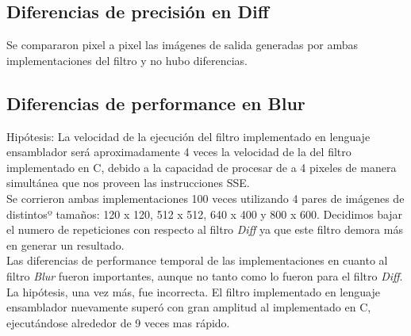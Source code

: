 \documentclass[10pt,a4paper,spanish]{article}
\begin{document}
\subsection{Diferencias de precisión en Diff}

Se compararon pixel a pixel las imágenes de salida generadas por ambas implementaciones del filtro y no hubo diferencias.

\subsection{Diferencias de performance en Blur}

Hipótesis: La velocidad de la ejecución del filtro implementado en lenguaje ensamblador será aproximadamente 4 veces la velocidad de la del filtro implementado en C, debido a la capacidad de procesar de a 4 pixeles de manera simultánea que nos proveen las instrucciones SSE. \\

Se corrieron ambas implementaciones 100 veces utilizando 4 pares de imágenes de distintosº tamaños: 120 x 120, 512 x 512, 640 x 400 y 800 x 600. Decidimos bajar el numero de repeticiones con respecto al filtro \textit{Diff} ya que este filtro demora más en generar un resultado.\\

Las diferencias de performance temporal de las implementaciones en cuanto al filtro \textit{Blur} fueron importantes, aunque no tanto como lo fueron para el filtro \textit{Diff}. La hipótesis, una vez más, fue incorrecta. El filtro implementado en lenguaje ensamblador nuevamente superó con gran amplitud al implementado en C, ejecutándose alrededor de 9 veces mas rápido. \\
\begin{center}
\end{center}
\end{document}
